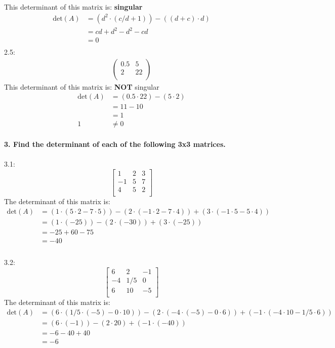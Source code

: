 \documentclass[a4paper,12pt]{article} %
\begin{document}
This determinant of this matrix is: \textbf{singular}
\begin{align*}
\text{det}(A) &= (d^2 \cdot (c/d+1)) - ((d+c) \cdot d) \\
&= cd+d^2 - d^2-cd  \\
&= 0 \\
\end{align*}
2.5: \\
\begin{align*}
\begin{pmatrix}
    0.5 & 5 \\
    2 & 22 \\
\end{pmatrix}
\end{align*}
This determinant of this matrix is: \textbf{NOT} singular
\begin{align*}
\text{det}(A) &= (0.5 \cdot 22) - (5 \cdot 2) \\
&= 11 - 10 \\
&= 1 \\
1 &\neq 0
\end{align*}
\\

\noindent
\textbf{3. Find the determinant of each of the following 3x3 matrices.} \\
\\ 3.1: \\
\[
\begin{bmatrix}
    1 & 2 & 3 \\
    -1 & 5 & 7 \\
    4 & 5 & 2 \\
\end{bmatrix}
\]
The determinant of this matrix is:
\begin{align*}
\text{det}(A) &= (1 \cdot (5 \cdot 2 - 7 \cdot 5)) - (2 \cdot (-1 \cdot 2 - 7 \cdot 4)) + (3 \cdot (-1 \cdot 5 - 5 \cdot 4)) \\
&= (1 \cdot (-25)) - (2 \cdot (-30)) + (3 \cdot (-25)) \\
&= -25 + 60 - 75 \\
&= -40 \\
\end{align*}
\\

3.2: \\
\[
\begin{bmatrix}
    6 & 2 & -1 \\
    -4 & 1/5 & 0 \\
    6 & 10 & -5 \\
\end{bmatrix}
\]
The determinant of this matrix is:
\begin{align*}
\text{det}(A) &= (6 \cdot (1/5 \cdot (-5) - 0 \cdot 10)) - (2 \cdot (-4 \cdot (-5) - 0 \cdot 6)) + (-1 \cdot (-4 \cdot 10 - 1/5 \cdot 6)) \\
&= (6 \cdot (-1)) - (2 \cdot 20) + (-1 \cdot (-40)) \\
&= -6 - 40 + 40 \\
&= -6 \\
\end{align*}
\\
\end{document}
